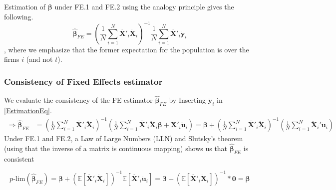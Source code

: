 Estimation of $\pmb{\beta}$ under FE.1 and FE.2 using the analogy principle gives the following.
\begin{equation} \label{EstimationEq}
    \pmb{\hat{\beta}}_{FE}= \left( \frac{1}{N} \sum_{i=1}^N {\pmb{\ddot{X'}}_{i} \pmb{\ddot{X}}_{i} } \right) ^{-1}\frac{1}{N} \sum_{i=1}^N {\pmb{\ddot{X'}}_{i} \pmb{\ddot{y}}_{i} }
\end{equation}
, where we emphasize that the former expectation for the population is over the firms $i$ (and not $t$).


\subsubsection*{Consistency of Fixed Effects estimator}
We evaluate the consistency of the FE-estimator $\pmb{\hat{\beta}}_{FE}$ by Inserting $\pmb{\ddot{y}}_i$ in \eqref{EstimationEq}.
\begin{align}
    \Rightarrow \pmb{\hat{\beta}}_{FE} &= \left( \frac{1}{N} \sum_{i=1}^N {\pmb{\ddot{X'}}_{i} \pmb{\ddot{X}}_{i} } \right) ^{-1} \left(\frac{1}{N} \sum_{i=1}^N {\pmb{\ddot{X'}}_{i}}\pmb{\ddot{X}}_{i} \pmb{\beta}+\pmb{\ddot{X'}}_{i}\pmb{\ddot{u}}_i \right) \nonumber = \pmb{\beta} +\left( \frac{1}{N} \sum_{i=1}^N {\pmb{\ddot{X'}}_{i} \pmb{\ddot{X}}_{i} } \right) ^{-1} \left( \frac{1}{N} \sum_{i=1}^N {\pmb{\ddot{X}}_i' \pmb{\ddot{u}}_i} \right) \label{FE-estimator}
\end{align}
Under FE.1 and FE.2, a Law of Large Numbers (LLN) and Slutsky's theorem (using that the inverse of a matrix is continuous mapping) shows us that $\pmb{\hat{\beta}}_{FE}$ is consistent

$$p\text{-lim}(\pmb{\hat{\beta}}_{FE})=\pmb{\beta} + \left( \mathbb{E}[\ddot{\pmb{X'}}_i \ddot{\pmb{X}}_i] \right)^{-1}\mathbb{E}[\ddot{\pmb{X'}}_i \ddot{\pmb{u}}_i]=\pmb{\beta} + \left( \mathbb{E}[\ddot{\pmb{X'}}_i \ddot{\pmb{X}}_i] \right)^{-1}*\pmb{0} =\pmb{\beta}$$

